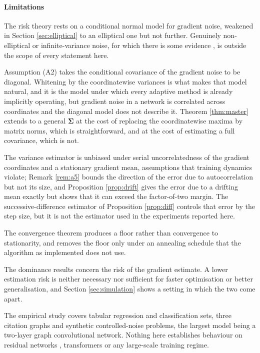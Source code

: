 \documentclass[pdflatex,sn-mathphys-num]{sn-jnl}%
\theoremstyle{thmstyleone}%
\theoremstyle{thmstyletwo}%
\theoremstyle{thmstylethree}%
\newcommand{\rev}[1]{{\color{blue}#1}}
\begin{document}
\paragraph{Limitations}

The risk theory rests on a conditional normal model for gradient noise, weakened in Section \ref{sec:elliptical} to an elliptical one but not further. Genuinely non-elliptical or infinite-variance noise, for which there is some evidence \cite{simsekli2019, gurbuzbalaban2021}, is outside the scope of every statement here.

Assumption (A2) takes the conditional covariance of the gradient noise to be diagonal. Whitening by the coordinatewise variances is what makes that model natural, and it is the model under which every adaptive method is already implicitly operating, but gradient noise in a network is correlated across coordinates and the diagonal model does not describe it. Theorem \ref{thm:master} extends to a general $\bm\Sigma$ at the cost of replacing the coordinatewise maxima by matrix norms, which is straightforward, and at the cost of estimating a full covariance, which is not.

The variance estimator is unbiased under serial uncorrelatedness of the gradient coordinates\rev{ and a stationary gradient mean, assumptions} that training dynamics violate; Remark \ref{rem:a5} bounds the direction of the \rev{error due to autocorrelation} but not its size\rev{, and Proposition \ref{prop:drift} gives the error due to a drifting mean exactly but shows that it can exceed the factor-of-two margin. The successive-difference estimator of Proposition \ref{prop:diff} controls that error by the step size, but it is not the estimator used in the experiments reported here.}

The convergence theorem produces a floor rather than convergence to stationarity, and removes the floor only under an annealing schedule that the algorithm as implemented does not use.

The dominance results concern the risk of the gradient estimate. A lower estimation risk is neither necessary nor sufficient for faster optimisation or better generalisation, and Section \ref{sec:simulation} shows a setting in which the two come apart.

The empirical study covers tabular regression and classification sets, three citation graphs and synthetic controlled-noise problems, the largest model being a two-layer graph convolutional network. Nothing here establishes behaviour on residual networks \cite{he2016}, transformers \cite{vaswani2017} or any large-scale training regime.
\end{document}
